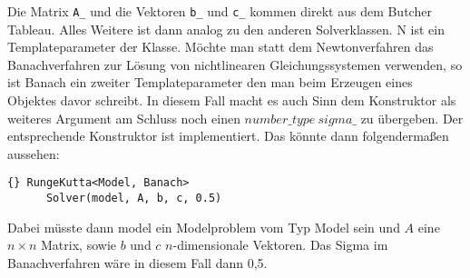 \documentclass[a4paper,11pt]{article}
\theoremstyle{definition}
\begin{document}
Die Matrix \lstinline{A_} und die Vektoren \lstinline{b_} und
\lstinline{c_} kommen direkt aus dem Butcher Tableau. Alles Weitere
ist dann analog zu den anderen Solverklassen. N ist ein
Templateparameter der Klasse. Möchte man statt dem Newtonverfahren das
Banachverfahren zur Lösung von nichtlinearen Gleichungssystemen
verwenden, so ist Banach ein zweiter Templateparameter den man beim
Erzeugen eines Objektes davor schreibt. In diesem Fall macht es auch
Sinn dem Konstruktor als weiteres Argument am Schluss noch einen
$number\_type \ sigma\_$ zu übergeben. Der entsprechende Konstruktor
ist implementiert.  Das könnte dann folgendermaßen aussehen:
{\footnotesize{\begin{lstlisting}{} RungeKutta<Model, Banach>
      Solver(model, A, b, c, 0.5)
\end{lstlisting}}}

Dabei müsste dann model ein Modelproblem vom Typ Model sein und $A$ eine
$n \times n$ Matrix, sowie $b$ und $c$ $n$-dimensionale Vektoren. Das
Sigma im Banachverfahren wäre in diesem Fall dann 0,5.
\end{document}
